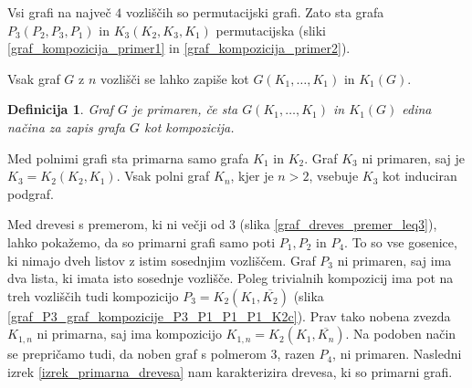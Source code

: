 \documentclass[a4paper, 12pt]{book}
\newtheorem{definicija}{Definicija}[chapter]
\begin{document}
Vsi grafi na največ $4$ vozliščih so permutacijski grafi. Zato sta grafa $P_3(P_2, P_3, P_1)$ in $K_3(K_2, K_3, K_1)$ permutacijska (sliki \ref{graf_kompozicija_primer1} in \ref{graf_kompozicija_primer2}).

Vsak graf $G$ z $n$ vozlišči se lahko zapiše kot $G(K_1, \dots, K_1)$ in $K_1(G)$.

\begin{definicija}
    Graf $G$ je primaren, če sta $G(K_1, \dots, K_1)$ in $K_1(G)$ edina načina za zapis grafa $G$ kot kompozicija.
\end{definicija}

Med polnimi grafi sta primarna samo grafa $K_1$ in $K_2$. Graf $K_3$ ni primaren, saj je $K_3 = K_2(K_2, K_1)$. Vsak polni graf $K_n$, kjer je $n > 2$, vsebuje $K_3$ kot induciran podgraf. 

Med drevesi s premerom, ki ni večji od 3 (slika \ref{graf_dreves_premer_leq3}), lahko pokažemo, da so primarni grafi samo poti $P_1, P_2$ in $P_4$. To so vse gosenice, ki nimajo dveh listov z istim sosednjim vozliščem. Graf $P_3$ ni primaren, saj ima dva lista, ki imata isto sosednje vozlišče. Poleg trivialnih kompozicij ima pot na treh vozliščih tudi kompozicijo $P_3 = K_2(K_1, \overline{K_2})$ (slika \ref{graf_P3_graf_kompozicije_P3_P1_P1_P1_K2c}). Prav tako nobena zvezda $K_{1,n}$ ni primarna, saj ima kompozicijo $K_{1,n} = K_2(K_1, \overline{K_n})$. Na podoben način se prepričamo tudi, da noben graf s polmerom $3$, razen $P_4$, ni primaren. Nasledni izrek \ref{izrek_primarna_drevesa} nam karakterizira drevesa, ki so primarni grafi.
\end{document}
